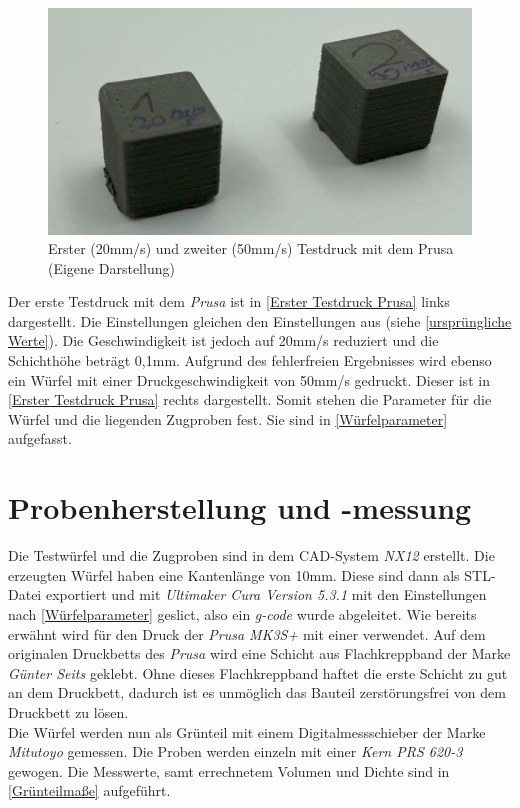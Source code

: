 \begin{figure}[h]
	\centering
	\includegraphics[width=\linewidth]{bilder/Erster Testdruck mit Prusa.png}
        \caption[Erster (20mm/s) und zweiter (50mm/s) Testdruck mit dem Prusa]{Erster (20mm/s) und zweiter (50mm/s) Testdruck mit dem Prusa (Eigene Darstellung)}
	\label{Erster Testdruck Prusa}
\end{figure}

Der erste Testdruck mit dem \textit{Prusa} ist in \autoref{Erster Testdruck Prusa} links dargestellt. Die Einstellungen gleichen den Einstellungen aus \autocite{M.Mickan}
(siehe \autoref{ursprüngliche Werte}). Die Geschwindigkeit ist jedoch auf 20mm/s reduziert und die Schichthöhe beträgt 0,1mm. Aufgrund des fehlerfreien Ergebnisses wird ebenso ein Würfel mit einer Druckgeschwindigkeit von 50mm/s gedruckt. Dieser ist in \autoref{Erster Testdruck Prusa} rechts dargestellt. Somit stehen die Parameter für die Würfel und die liegenden Zugproben fest. Sie sind in \autoref{Würfelparameter} aufgefasst. 

\section{Probenherstellung und -messung}

Die Testwürfel und die Zugproben sind in dem CAD-System \textit{NX12} erstellt. Die erzeugten Würfel haben eine Kantenlänge von 10mm. Diese sind dann als STL-Datei exportiert und mit \textit{Ultimaker Cura Version 5.3.1} mit den Einstellungen nach \autoref{Würfelparameter} geslict, also ein \textit{g-code} wurde abgeleitet. Wie bereits erwähnt wird für den Druck der \textit{Prusa MK3S+} mit einer verwendet. Auf dem originalen Druckbetts des \textit{Prusa} wird eine Schicht aus Flachkreppband der Marke \textit{Günter Seits} geklebt. Ohne dieses Flachkreppband haftet die erste Schicht zu gut an dem Druckbett, dadurch ist es unmöglich das Bauteil zerstörungsfrei von dem Druckbett zu lösen.\\
Die Würfel werden nun als Grünteil mit einem Digitalmessschieber der Marke \textit{Mitutoyo} gemessen. Die Proben werden einzeln mit einer \textit{Kern PRS 620-3} gewogen. Die Messwerte, samt errechnetem Volumen und Dichte sind in \autoref{Grünteilmaße} aufgeführt.